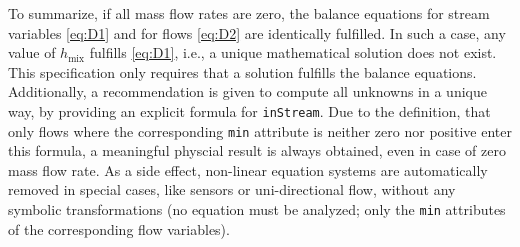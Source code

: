 To summarize, if all mass flow rates are zero, the balance equations for stream variables \eqref{eq:D1} and for flows \eqref{eq:D2} are identically fulfilled.
In such a case, any value of $h_{\mathrm{mix}}$ fulfills \eqref{eq:D1}, i.e., a unique mathematical solution does not exist.
This specification only requires that a solution fulfills the balance equations.
Additionally, a recommendation is given to compute all unknowns in a unique way, by providing an explicit formula for \lstinline!inStream!.
Due to the definition, that only flows where the corresponding \lstinline!min! attribute is neither zero nor positive enter this formula, a meaningful physcial result is always obtained, even in case of zero mass flow rate.
As a side effect, non-linear equation systems are automatically removed in special cases, like sensors or uni-directional flow, without any symbolic transformations (no equation must be analyzed; only the \lstinline!min! attributes of the corresponding flow variables).
